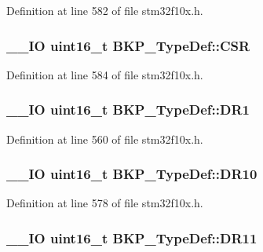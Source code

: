 Definition at line 582 of file stm32f10x.\-h.

\hypertarget{struct_b_k_p___type_def_a8edc0ddaac3db876f8d3ddee902bc610}{
\subsubsection[{C\-S\-R}]{\setlength{\rightskip}{0pt plus 5cm}\-\_\-\-\_\-\-I\-O {\bf uint16\-\_\-t} B\-K\-P\-\_\-\-Type\-Def\-::\-C\-S\-R}}\label{struct_b_k_p___type_def_a8edc0ddaac3db876f8d3ddee902bc610}


Definition at line 584 of file stm32f10x.\-h.

\hypertarget{struct_b_k_p___type_def_aaa1a907c0aaf85c6de3aa3d829a07a3a}{
\subsubsection[{D\-R1}]{\setlength{\rightskip}{0pt plus 5cm}\-\_\-\-\_\-\-I\-O {\bf uint16\-\_\-t} B\-K\-P\-\_\-\-Type\-Def\-::\-D\-R1}}\label{struct_b_k_p___type_def_aaa1a907c0aaf85c6de3aa3d829a07a3a}


Definition at line 560 of file stm32f10x.\-h.

\hypertarget{struct_b_k_p___type_def_a36060bb3e662e5c2370892caf1a19da6}{
\subsubsection[{D\-R10}]{\setlength{\rightskip}{0pt plus 5cm}\-\_\-\-\_\-\-I\-O {\bf uint16\-\_\-t} B\-K\-P\-\_\-\-Type\-Def\-::\-D\-R10}}\label{struct_b_k_p___type_def_a36060bb3e662e5c2370892caf1a19da6}


Definition at line 578 of file stm32f10x.\-h.

\hypertarget{struct_b_k_p___type_def_af0938123a38313da403033b8f8d7bc5c}{
\subsubsection[{D\-R11}]{\setlength{\rightskip}{0pt plus 5cm}\-\_\-\-\_\-\-I\-O {\bf uint16\-\_\-t} B\-K\-P\-\_\-\-Type\-Def\-::\-D\-R11}}\label{struct_b_k_p___type_def_af0938123a38313da403033b8f8d7bc5c}


